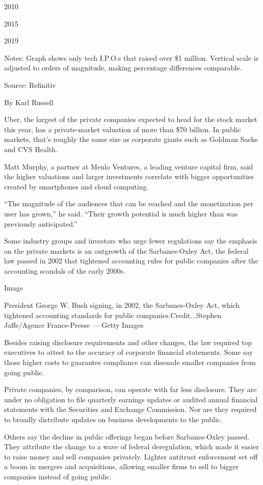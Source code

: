 2010

2015

2019

Notes: Graph shows only tech I.P.O.s that raised over \$1 million.
Vertical scale is adjusted to orders of magnitude, making percentage
differences comparable.

Source: Refinitiv

By Karl Russell

Uber, the largest of the private companies expected to head for the
stock market this year, has a private-market valuation of more than \$70
billion. In public markets, that's roughly the same size as corporate
giants such as Goldman Sachs and CVS Health.

Matt Murphy, a partner at Menlo Ventures, a leading venture capital
firm, said the higher valuations and larger investments correlate with
bigger opportunities created by smartphones and cloud computing.

``The magnitude of the audiences that can be reached and the
monetization per user has grown,'' he said. ``Their growth potential is
much higher than was previously anticipated.''

Some industry groups and investors who urge fewer regulations say the
emphasis on the private markets is an outgrowth of the Sarbanes-Oxley
Act, the federal law passed in 2002 that tightened accounting rules for
public companies after the accounting scandals of the early 2000s.

Image

President George W. Bush signing, in 2002, the Sarbanes-Oxley Act, which
tightened accounting standards for public companies.Credit...Stephen
Jaffe/Agence France-Presse --- Getty Images

Besides raising disclosure requirements and other changes, the law
required top executives to attest to the accuracy of corporate financial
statements. Some say those higher costs to guarantee compliance can
dissuade smaller companies from going public.

Private companies, by comparison, can operate with far less disclosure.
They are under no obligation to file quarterly earnings updates or
audited annual financial statements with the Securities and Exchange
Commission. Nor are they required to broadly distribute updates on
business developments to the public.

Others say the decline in public offerings began before Sarbanes-Oxley
passed. They attribute the change to a wave of federal deregulation,
which made it easier to raise money and sell companies privately.
Lighter antitrust enforcement set off a boom in mergers and
acquisitions, allowing smaller firms to sell to bigger companies instead
of going public.

